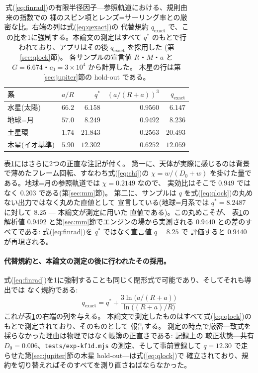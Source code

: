 \documentclass[a4paper,10pt,twocolumn]{ltjsarticle}
\begin{document}
\begin{table}[t]
\centering
\caption{式(\ref{eq:finrad})の有限半径因子---参照軌道における、規則由来の指数での
  裸のスピン項とレンズ=サーリング率との厳密な比。右端の列は式(\ref{eq:qexact})の
  代替規約 $q_{\mathrm{exact}}$ で、この比を1に強制する。本論文の測定はすべて
  $q^{*}$ のもとで行われており、アプリはその後 $q_{\mathrm{exact}}$ を採用した
  (第\ref{sec:qlock}節)。
  各サンプルの宣言値 $R$・$M$・$a$ と $G=6.674$・$c_0=3\times10^{4}$ から計算した。
  木星の行は第\ref{sec:jupiter}節の hold-out である。}
\label{tab:finrad}
{\small\setlength{\tabcolsep}{3pt}
\begin{tabular}{lrrrr}
\toprule
系 & $a/R$ & $q^{*}$ & $(a/(R+a))^{3}$ & $q_{\mathrm{exact}}$ \\
\midrule
水星(太陽) & $66.2$ & $6.158$ & $0.9560$ & $6.147$ \\
地球=月 & $57.0$ & $8.249$ & $0.9492$ & $8.236$ \\
土星環 & $1.74$ & $21.843$ & $0.2563$ & $20.493$ \\
木星(イオ基準) & $5.90$ & $12.302$ & $0.6252$ & $12.059$ \\
\bottomrule
\end{tabular}}
\end{table}

表\ref{tab:finrad}にはさらに2つの正直な注記が付く。
第一に、天体が実際に感じるのは背景で薄めたフレーム回転、すなわち式(\ref{eq:chi})の
$\chi=w/(D_0+w)$ を掛けた量である。地球=月の参照軌道では $\chi=0.2149$ なので、
実効比はそこで $0.949$ ではなく $0.203$ である(第\ref{sec:mm}節)。
第二に、サンプルは $q$ を式(\ref{eq:qlock})の丸めない出力ではなく丸めた直値として
宣言している(地球=月系では $q^{*}=8.2487$ に対して $8.25$ — 本論文が測定に用いた
直値である)。この丸めこそが、
表\ref{tab:finrad}の解析値 $0.9492$ と第\ref{sec:mm}節でエンジンの場から実測される
$0.9440$ との差のすべてである: 式(\ref{eq:finrad})を $q^{*}$ ではなく宣言値 $q=8.25$ で
評価すると $0.9440$ が再現される。

\paragraph*{代替規約と、本論文の測定の後に行われたその採用。}
式(\ref{eq:finrad})を1に強制することも同じく閉形式で可能であり、そしてそれも導出では
なく規約である:
\begin{equation}
  q_{\mathrm{exact}} = q^{*}
    + \frac{3\ln\bigl(a/(R+a)\bigr)}{\ln\bigl((R+a)/R\bigr)}
  \label{eq:qexact}
\end{equation}
これが表\ref{tab:finrad}の右端の列を与える。
本論文で測定したものはすべて式(\ref{eq:qlock})のもとで測定されており、そのものとして
報告する。
測定の時点で厳密一致式を採らなかった理由は物理ではなく帳簿の正直さである: 記録上の
較正状態---共有 $D_0=0.006$、\texttt{tests/exp-kf1d.mjs} の測定、そして事前登録して
$q=12.30$ で走らせた第\ref{sec:jupiter}節の木星 hold-out---は式(\ref{eq:qlock})で
確立されており、規約を切り替えればそのすべてを測り直さねばならなかった。
\end{document}

